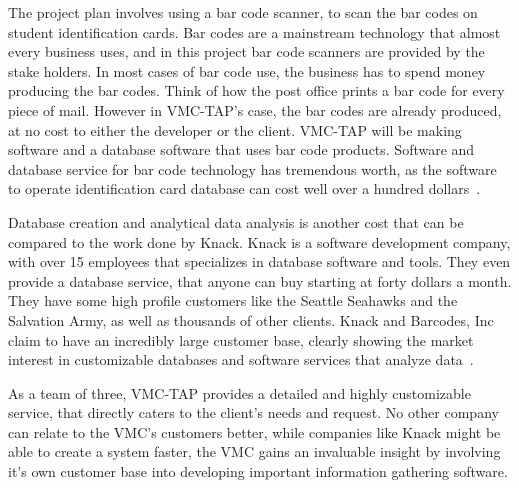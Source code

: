  The project plan involves using a bar code scanner, to scan the bar codes on student identification cards. Bar codes are a mainstream technology that almost every business uses, and in this project bar code scanners are provided by the stake holders. In most cases of bar code use, the business has to spend money producing the bar codes. Think of how the post office prints a bar code for every piece of mail. However in VMC-TAP's case, the bar codes are already produced, at no cost to either the developer or the client.  VMC-TAP will be making software and a database software that uses bar code products. Software and database service for bar code technology has tremendous worth, as the software to operate identification card database can cost well over a hundred dollars~\cite{BARCODES_INC:2}. 


Database creation and analytical data analysis is another cost that can be compared to the work done by Knack. Knack is a software development company, with over 15 employees that specializes in database software and tools. They even provide a database service, that anyone can buy starting at forty dollars a month. They have some high profile customers like the Seattle Seahawks and the Salvation Army, as well as thousands of other clients. Knack and Barcodes, Inc claim to have an incredibly large customer base, clearly showing the market interest in customizable databases and software services that analyze data~\cite{KNACK:1}.

As a team of three, VMC-TAP provides a detailed and highly customizable service, that directly caters to the client's needs and request. No other company can relate to the VMC's customers better, while companies like Knack might be able to create a system faster, the VMC gains an invaluable insight by involving it's own customer base into developing important information gathering software. 

